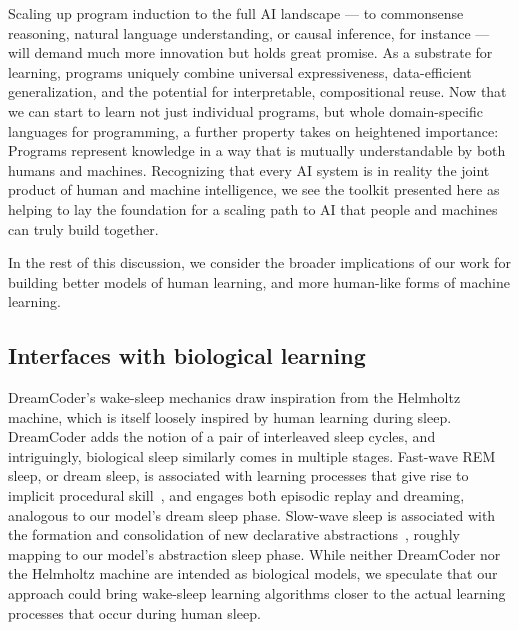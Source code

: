 \documentclass[12pt]{article}
\begin{document}
Scaling up program induction to the full AI landscape --- to commonsense reasoning, natural language understanding, or causal inference, for instance --- will demand much more innovation but holds great promise. As a substrate for learning, programs uniquely combine universal expressiveness, data-efficient generalization, and the potential for interpretable, compositional reuse.  Now that we can start to learn not just individual programs, but whole %
domain-specific languages for programming, a further property takes on heightened importance: Programs represent knowledge in a way that is mutually understandable by both humans and machines. Recognizing that every AI system %
is in reality the joint product of human and machine intelligence, %
we see the toolkit presented here as helping to lay the foundation for a scaling path to AI that people and machines can truly build together.

In the rest of this discussion, we  consider the broader implications of our work for building better models of human learning, and more human-like forms of machine learning.

\subsection*{Interfaces with biological learning}

DreamCoder's wake-sleep mechanics draw inspiration from the Helmholtz machine, which is itself loosely inspired by human learning during sleep.
DreamCoder adds the notion of a pair of interleaved sleep cycles, 
and intriguingly, biological sleep similarly comes in multiple stages.
Fast-wave REM sleep, or dream sleep, is associated with learning processes that give rise to implicit procedural skill~\cite{fosse2003dreaming},
and engages both episodic replay and dreaming,
analogous to our model's dream sleep phase.
Slow-wave sleep is associated with the formation and consolidation of new declarative abstractions~\cite{DUDAI201520},
roughly mapping to our model's abstraction sleep phase.
While neither DreamCoder nor the Helmholtz machine are intended as  biological models,
we speculate that our approach could bring 
wake-sleep learning algorithms closer to the actual learning processes
that occur during human sleep.
\end{document}
